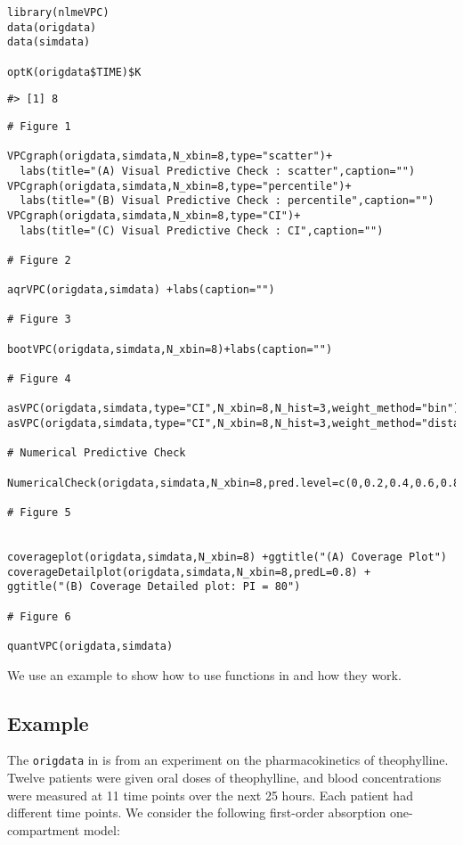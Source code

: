 \begin{verbatim}
library(nlmeVPC)
data(origdata)
data(simdata)

optK(origdata$TIME)$K
\end{verbatim}

\begin{verbatim}
#> [1] 8
\end{verbatim}

\begin{verbatim}
# Figure 1

VPCgraph(origdata,simdata,N_xbin=8,type="scatter")+
  labs(title="(A) Visual Predictive Check : scatter",caption="")
VPCgraph(origdata,simdata,N_xbin=8,type="percentile")+
  labs(title="(B) Visual Predictive Check : percentile",caption="")
VPCgraph(origdata,simdata,N_xbin=8,type="CI")+
  labs(title="(C) Visual Predictive Check : CI",caption="")
  
# Figure 2

aqrVPC(origdata,simdata) +labs(caption="")

# Figure 3

bootVPC(origdata,simdata,N_xbin=8)+labs(caption="")
 
# Figure 4

asVPC(origdata,simdata,type="CI",N_xbin=8,N_hist=3,weight_method="bin")+labs(caption="")
asVPC(origdata,simdata,type="CI",N_xbin=8,N_hist=3,weight_method="distance")+labs(caption="")
  
# Numerical Predictive Check
 
NumericalCheck(origdata,simdata,N_xbin=8,pred.level=c(0,0.2,0.4,0.6,0.8,0.9))$NPC

# Figure 5
 

coverageplot(origdata,simdata,N_xbin=8) +ggtitle("(A) Coverage Plot")
coverageDetailplot(origdata,simdata,N_xbin=8,predL=0.8) +
ggtitle("(B) Coverage Detailed plot: PI = 80")
 
# Figure 6
 
quantVPC(origdata,simdata)
\end{verbatim}

We use an example to show how to use functions in  and how they work.

\hypertarget{example}{%
\subsection{Example}\label{example}}

The \texttt{origdata} in  is from an experiment on the pharmacokinetics of theophylline. Twelve patients were given oral doses of theophylline, and blood concentrations were measured at 11 time points over the next 25 hours. Each patient had different time points.
We consider the following first-order absorption one-compartment model:

